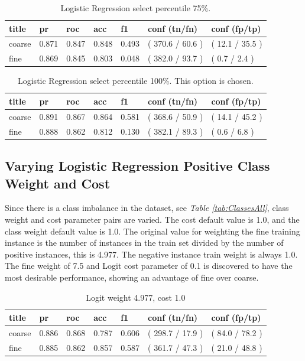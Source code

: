 \documentclass[ms]{nuthesis}
\begin{document}
\FloatBarrier
\begin{table}[H]
\centering
\caption{Logistic Regression select percentile 75\%.}
\label{tab:LogRegSel75}
\begin{tabular}{|l||l||l||l||l||l||l|}\toprule
title & pr & roc & acc & f1 & conf (tn/fn) & conf (fp/tp) \\ \midrule
coarse & 0.871 & 0.847 & 0.848 & 0.493 & ( 370.6 / 60.6 ) & ( 12.1 / 35.5 ) \\
fine & 0.869 & 0.845 & 0.803 & 0.048 & ( 382.0 / 93.7 ) & ( 0.7 / 2.4 ) \\ \bottomrule
\end{tabular}
\end{table}
\FloatBarrier


\FloatBarrier
\begin{table}[H]
\centering
\caption{Logistic Regression select percentile 100\%. This option is chosen.}
\label{tab:LogRegMinMax}
\begin{tabular}{|l||l||l||l||l||l||l|}\toprule
title & pr & roc & acc & f1 & conf (tn/fn) & conf (fp/tp) \\ \midrule
coarse & 0.891 & 0.867 & 0.864 & 0.581 & ( 368.6 / 50.9 ) & ( 14.1 / 45.2 ) \\
fine & 0.888 & 0.862 & 0.812 & 0.130 & ( 382.1 / 89.3 ) & ( 0.6 / 6.8 ) \\ \bottomrule
\end{tabular}
\end{table}
\FloatBarrier


\subsection{Varying Logistic Regression Positive Class Weight and Cost}
\par Since there is a class imbalance in the dataset, see \textit{Table \ref{tab:ClassesAll}},
class weight and cost parameter pairs are varied.  The cost
default value is 1.0, and the class weight default value is 1.0. The original value for weighting the
fine training instance is the number of instances in the train set divided by the number of positive
instances, this is 4.977. The negative instance train weight is always 1.0. The fine weight of 7.5
and Logit cost parameter of 0.1 is discovered to have the most desirable performance, showing an
advantage of fine over coarse.

\FloatBarrier
\begin{table}[H]
\centering
\caption{Logit weight 4.977, cost 1.0}
\label{tab:LogRegWtOrig-C1}
\begin{tabular}{|l||l||l||l||l||l||l|}\toprule
title & pr & roc & acc & f1 & conf (tn/fn) & conf (fp/tp) \\ \midrule
coarse & 0.886 & 0.868 & 0.787 & 0.606 & ( 298.7 / 17.9 ) & ( 84.0 / 78.2 ) \\
fine & 0.885 & 0.862 & 0.857 & 0.587 & ( 361.7 / 47.3 ) & ( 21.0 / 48.8 ) \\ \bottomrule
\end{tabular}
\end{table}
\FloatBarrier
\end{document}
